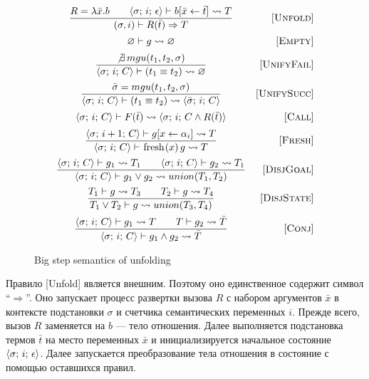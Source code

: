 \begin{figure}[h!]
\[\begin{array}{cr}

\dfrac{ R = \lambda \bar{x}. b \qquad \inbr{\sigma;\, i;\, \epsilon} \vdash b[\bar{x} \leftarrow \bar{t}] \leadsto T}
      {(\sigma, i) \vdash R(\bar{t}) \Rightarrow T}
&     \ruleno{Unfold} \\[4mm]
{\emptyset \vdash g \leadsto \emptyset}
&     \ruleno{Empty} \\[2mm]
\dfrac{\not\exists \, mgu(t_1, t_2, \sigma)}
      {\inbr{\sigma;\, i;\, C} \vdash (t_1 \equiv t_2) \leadsto \emptyset}
&     \ruleno{UnifyFail}  \\[4mm]
\dfrac{\bar\sigma = mgu(t_1, t_2, \sigma)}
      {\inbr{\sigma;\, i;\, C} \vdash (t_1 \equiv t_2) \leadsto \inbr{\bar\sigma;\, i;\, C}}
&     \ruleno{UnifySucc}  \\[4mm]
      {\inbr{\sigma;\, i;\, C} \vdash F(\bar{t}) \leadsto \inbr{\sigma;\, i;\,C \land R(\bar{t})}}
&     \ruleno{Call} \\[2mm]
\dfrac{\inbr{\sigma;\, i+1;\, C} \vdash g[x \leftarrow \alpha_i] \leadsto T}
      {\inbr{\sigma;\, i;\, C} \vdash \mbox{\lstinline|fresh|} (x)\, g \leadsto T}
&     \ruleno{Fresh}  \\[4mm]
\dfrac{\inbr{\sigma;\, i;\, C} \vdash g_1 \leadsto T_1 \qquad \inbr{\sigma;\, i;\, C} \vdash g_2 \leadsto T_1}
      {\inbr{\sigma;\, i;\, C} \vdash g_1 \lor g_2 \leadsto union(T_1, T_2)}
&     \ruleno{DisjGoal}  \\[4mm]
\dfrac{T_1 \vdash g \leadsto T_3 \qquad T_2 \vdash g \leadsto T_4}
      {T_1 \lor T_2 \vdash g \leadsto union(T_3, T_4)}
&     \ruleno{DisjState}  \\[4mm]
\dfrac{\inbr{\sigma;\, i;\, C} \vdash g_1 \leadsto T \qquad T \vdash g_2 \leadsto \bar{T}}
      {\inbr{\sigma;\, i;\, C} \vdash g_1 \land g_2 \leadsto \bar{T}}
&     \ruleno{Conj}
\end{array}\]

\caption{Big step semantics of unfolding}
\label{fair:unfolding-semantics}
\end{figure}

Правило [Unfold] является внешним. Поэтому оно единственное содержит символ ``$\Rightarrow$''. Оно запускает процесс развертки вызова $R$ с набором аргументов $\bar{x}$ в контексте подстановки  $\sigma$ и счетчика семантических переменных $i$. Прежде всего, вызов $R$ заменяется на $b$ --- тело отношения. Далее выполняется подстановка термов $\bar{t}$ на место переменных $\bar{x}$ и инициализируется начальное состояние $\langle \sigma;\, i;\, \epsilon \rangle$. Далее запускается преобразование тела отношения в состояние с помощью оставшихся правил.

